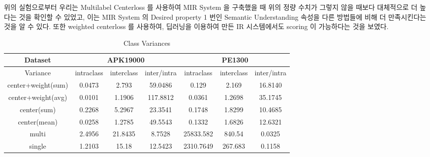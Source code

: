 위의 실험으로부터 우리는 Multilabel Centerloss 를 사용하여 MIR System 을 구축했을 때 위의 정량 수치가 그렇지 않을 때보다 대체적으로 더 높다는 것을 확인할 수 있었고, 이는 MIR System 의 Desired property 1 번인 Semantic Understanding 속성을 다른 방법들에 비해 더 만족시킨다는 것을 알 수 있다. 또한 weighted centerloss 를 사용하여, 딥러닝을 이용하여 만든 IR 시스템에서도 scoring 이 가능하다는 것을 보였다. 

\begin{table*}[!htb]%
\caption{Class Variances}
\label{tab:class_variances}
\begin{minipage}{\textwidth}
\begin{center}
\begin{tabular}{|c|c|c|c|c|c|c|}
\hline
Dataset             & \multicolumn{3}{c|}{APK19000}                               & \multicolumn{3}{c|}{PE1300}                                             \\ \hline
Variance              & intraclass  & interclass  & inter/intra & intraclass  & interclass  & inter/intra  \\ \hline
center+weight(sum)  & 0.0473              &         2.793       &     59.0486             & 0.129               &              2.169 &              16.8140    \\ \hline
center+weight(avg) & 0.0101              &              1.1906 &    117.8812             & 0.0361              &                    1.2698 &      35.1745                   \\ \hline
center(sum)         & 0.2268              &                    5.2967 &          23.3541               & 0.1748              &              1.8299       &    10.4685                     \\ \hline
center(mean)        & 0.0258              &                    1.2785 &           49.5543              & 0.1332              &        1.6826             &     12.6321                    \\ \hline
multi               & 2.4956              &                    21.8435 &       8.7528                    & 25833.582           &        840.54             &        0.0325               \\ \hline
single              & 1.2103              &                    15.18 &            12.5423             & 2310.7649           &      267.683               &           0.1158              \\ \hline
\end{tabular}
\end{center}
\bigskip\centering
\end{minipage}
\end{table*}%
